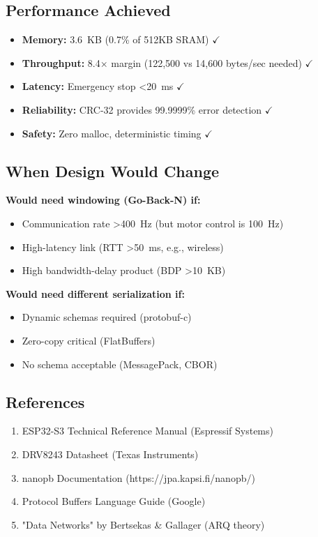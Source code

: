 \documentclass[12pt,letterpaper]{article}
\begin{document}
\subsection{Performance Achieved}

\begin{itemize}
    \item \textbf{Memory:} 3.6~KB (0.7\% of 512KB SRAM) $\checkmark$
    \item \textbf{Throughput:} 8.4× margin (122,500 vs 14,600 bytes/sec needed) $\checkmark$
    \item \textbf{Latency:} Emergency stop <20~ms $\checkmark$
    \item \textbf{Reliability:} CRC-32 provides 99.9999\% error detection $\checkmark$
    \item \textbf{Safety:} Zero malloc, deterministic timing $\checkmark$
\end{itemize}

\subsection{When Design Would Change}

\textbf{Would need windowing (Go-Back-N) if:}
\begin{itemize}
    \item Communication rate >400~Hz (but motor control is 100~Hz)
    \item High-latency link (RTT >50~ms, e.g., wireless)
    \item High bandwidth-delay product (BDP >10~KB)
\end{itemize}

\textbf{Would need different serialization if:}
\begin{itemize}
    \item Dynamic schemas required (protobuf-c)
    \item Zero-copy critical (FlatBuffers)
    \item No schema acceptable (MessagePack, CBOR)
\end{itemize}

\subsection{References}

\begin{enumerate}
    \item ESP32-S3 Technical Reference Manual (Espressif Systems)
    \item DRV8243 Datasheet (Texas Instruments)
    \item nanopb Documentation (https://jpa.kapsi.fi/nanopb/)
    \item Protocol Buffers Language Guide (Google)
    \item "Data Networks" by Bertsekas \& Gallager (ARQ theory)
\end{enumerate}
\end{document}
